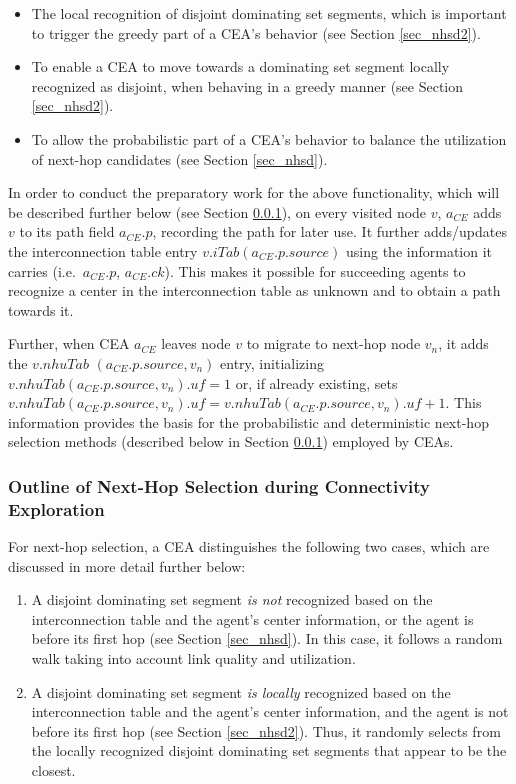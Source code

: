 \begin{itemize}

\item The local recognition of disjoint dominating set segments, which is important to trigger the greedy part of a CEA's behavior (see Section \ref{sec_nhsd2}).

\item To enable a CEA to move towards a dominating set segment locally recognized as disjoint, when behaving in a greedy manner (see Section \ref{sec_nhsd2}).

\item To allow the probabilistic part of a CEA's behavior to balance the utilization of next-hop candidates (see Section \ref{sec_nhsd}).

\end{itemize}

In order to conduct the preparatory work for the above functionality, which will be described further below (see Section \ref{sec_oonh}), on every visited node $v$, $a_{CE}$ adds $v$ to its path field $a_{CE}.p$, recording the path for later use. It further adds/updates the interconnection table entry $v.iTab(a_{CE}.p.source)$ using the information it carries (i.e.\ $a_{CE}.p$, $a_{CE}.ck$). This makes it possible for succeeding agents to recognize a center in the interconnection table as unknown and to obtain a path towards it. 

Further, when CEA $a_{CE}$ leaves node $v$ to migrate to next-hop node $v_n$, it adds the $v.nhuTab$ $(a_{CE}.p.source,v_n)$ entry, initializing $v.nhuTab(a_{CE}.p.source,v_n).uf=1$ or, if already existing, sets $v.nhuTab(a_{CE}.p.source,v_n).uf=v.nhuTab(a_{CE}.p.source,v_n).uf+1$. This information provides the basis for the probabilistic and deterministic next-hop selection methods (described below in Section \ref{sec_oonh}) employed by CEAs.


\subsubsection{Outline of Next-Hop Selection during Connectivity Exploration}\label{sec_oonh}\label{secoonhs} For next-hop selection, a CEA distinguishes the following two cases, which are discussed in more detail further below: 

\begin{enumerate}

	\item A disjoint dominating set segment \emph{is not} recognized based on the interconnection table and the agent's center information, or the agent is before its first hop (see Section \ref{sec_nhsd}). In this case, it follows a random walk taking into account link quality and utilization.
	
	\item A disjoint dominating set segment \emph{is locally} recognized based on the interconnection table and the agent's center information, and the agent is not before its first hop (see Section \ref{sec_nhsd2}). Thus, it randomly selects from the locally recognized disjoint dominating set segments that appear to be the closest.

\end{enumerate}

